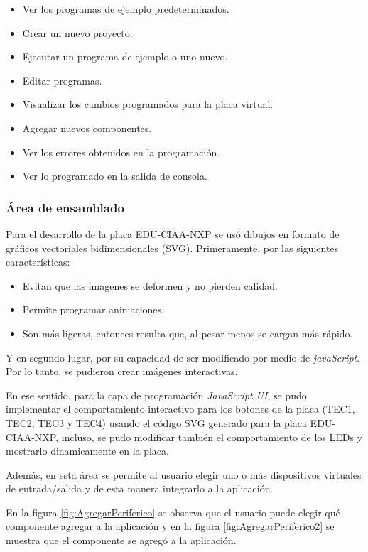 \begin{itemize}
	\item Ver los programas de ejemplo predeterminados.
	\item Crear un nuevo proyecto.
	\item Ejecutar un programa de ejemplo o uno nuevo.
	\item Editar programas.
	\item Visualizar los cambios programados para la placa virtual.
	\item Agregar nuevos componentes.
	\item Ver los errores obtenidos en la programación.
	\item Ver lo programado en la salida de consola.
\end{itemize}

\subsubsection{Área de ensamblado}

Para el desarrollo de la placa EDU-CIAA-NXP se usó dibujos en formato de gráficos vectoriales bidimensionales (SVG). Primeramente, por las siguientes características:

\begin{itemize}
	\item Evitan que las imagenes se deformen y no pierden calidad.
	\item Permite programar animaciones.
	\item Son más ligeras, entonces resulta que, al pesar menos se cargan más rápido.
\end{itemize}

Y en segundo lugar, por su capacidad de ser modificado por medio de \textit{javaScript}. Por lo tanto, se pudieron crear imágenes interactivas.

En ese sentido, para la capa de programación \textit{JavaScript UI}, se pudo implementar el comportamiento interactivo para los botones de la placa (TEC1, TEC2, TEC3 y TEC4) usando el código SVG generado para la placa EDU-CIAA-NXP, incluso, se pudo modificar también el comportamiento de los LEDs y mostrarlo dinamicamente en la placa.


Además, en esta área se permite al usuario elegir uno o más dispositivos virtuales de entrada/salida y de esta manera integrarlo a la aplicación.


En la figura \ref{fig:AgregarPeriferico} se observa que el usuario puede elegir qué componente agregar a la aplicación y en la figura \ref{fig:AgregarPeriferico2} se muestra que el componente se agregó a la aplicación.

